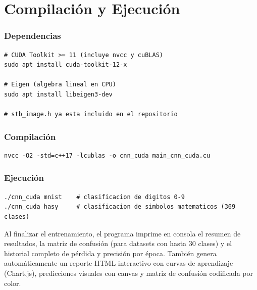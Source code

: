 \documentclass[12pt,a4paper]{article}
\begin{document}
\section*{Compilación y Ejecución}

\subsubsection*{Dependencias}

\begin{lstlisting}[numbers=none]
# CUDA Toolkit >= 11 (incluye nvcc y cuBLAS)
sudo apt install cuda-toolkit-12-x

# Eigen (algebra lineal en CPU)
sudo apt install libeigen3-dev

# stb_image.h ya esta incluido en el repositorio
\end{lstlisting}

\subsubsection*{Compilación}

\begin{lstlisting}[numbers=none]
nvcc -O2 -std=c++17 -lcublas -o cnn_cuda main_cnn_cuda.cu
\end{lstlisting}

\subsubsection*{Ejecución}

\begin{lstlisting}[numbers=none]
./cnn_cuda mnist    # clasificacion de digitos 0-9
./cnn_cuda hasy     # clasificacion de simbolos matematicos (369 clases)
\end{lstlisting}

Al finalizar el entrenamiento, el programa imprime en consola el resumen de resultados,
la matriz de confusión (para datasets con hasta 30 clases) y el historial completo de
pérdida y precisión por época. También genera automáticamente un reporte HTML
interactivo con curvas de aprendizaje (Chart.js), predicciones visuales con canvas y
matriz de confusión codificada por color.
\end{document}
